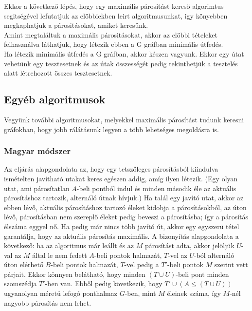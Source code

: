 \documentclass[12pt]{article}
\begin{document}
Ekkor a következő lépés, hogy egy maximális párositást kereső algorimtus segitségével lefutatjuk az elöbbiekben leirt algoritmusunkat, igy könyebben megkaphatjuk a párositásokat, amiket keresünk.\\
Amint megtaláltuk a maximális párositásokat, akkor az elöbbi tételeket felhasználva láthatjuk, hogy létezik ebben a G gráfban minimális útfedés.\\
Ha létezik minimális útfedés a G gráfban, akkor készen vagyunk. Ekkor egy útat vehetünk egy tesztesetnek és az útak összességét pedig tekinthetjük a tesztelés alatt létrehozott összes tesztesetnek.
\pagebreak

\subsection{Egyéb algoritmusok}

Vegyünk további algoritmusokat, melyekkel maximális párosítást tudunk keresni gráfokban, hogy jobb rálátásunk legyen a több lehetséges megoldásra is.

\subsubsection{Magyar módszer}

Az eljárás alapgondolata az, hogy egy tetszőleges párosításból kiindulva ismételten javítható utakat keres egészen addig, amíg ilyen létezik. (Egy olyan utat, ami párosítatlan $A$-beli pontból indul és minden második éle az aktuális párosításhoz tartozik, alternáló útnak hívjuk.) Ha talál egy javító utat, akkor az ebben lévő, aktuális párosításhoz tartozó éleket kidobja a párosításokból, az úton lévő, párosításban nem szereplő éleket pedig beveszi a párosításba; így a párosítás élszáma eggyel
nő. Ha pedig már nincs több javító út, akkor egy egyszerü tétel garantálja, hogy az
aktuális párosítás maximális. A bizonyítás alapgondolata a következő: ha az algoritmus már leállt és az $M$ párosítást adta, akkor jelöljük $U$-val az $M$ által le nem
fedett $A$-beli pontok halmazát, $T$-vel az $U$-ból alternáló úton elérhető $B$-beli pontok halmazát, $T$-vel pedig a $T'$-beli pontok $M$ szerint vett párjait. Ekkor könnyen belátható, hogy minden $(T \cup U)$-beli pont minden szomszédja $T'$-ben van. Ebből pedig következik, hogy $T' \cup (A \leq (T \cup U))$ ugyanolyan méretü lefogó ponthalmaz $G$-ben, mint $M$ éleinek száma, így $M$-nél nagyobb párosítás nem lehet. ~\cite{frank2002magyar}\\ 
\end{document}
